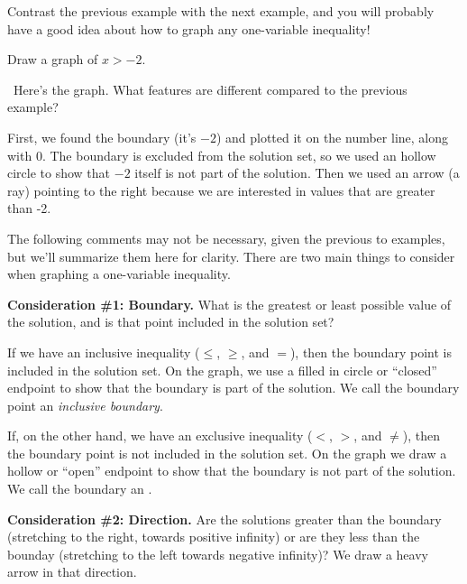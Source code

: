 Contrast the previous example with the next example, and you will probably have a good idea about how to graph any one-variable inequality!

\begin{boxedex}
Draw a graph of $x > -2$.

\exsoln\ Here's the graph. What features are different compared to the previous example?

\begin{center}
\end{center}

First, we found the boundary (it's $-2$) and plotted it on the number line, along with 0. The boundary is excluded from the solution set, so we used an hollow circle to show that $-2$ itself is not part of the solution. Then we used an arrow (a ray) pointing to the right because we are interested in values that are greater than -2.
\end{boxedex}

The following comments may not be necessary, given the previous to examples, but we'll summarize them here for clarity. There are two main things to consider when graphing a one-variable inequality.

\textbf{Consideration \#1: Boundary.} What is the greatest or least possible value of the solution, and is that point included in the solution set?

If we have an inclusive inequality ($\leq$, $\geq$, and $=$), then the boundary point is included in the solution set. On the graph, we use a filled in circle or ``closed'' endpoint to show that the boundary is part of the solution. We call the boundary point an \textit{inclusive boundary}.

If, on the other hand, we have an exclusive inequality ($<$, $>$, and $\neq$), then the boundary point is not included in the solution set. On the graph we draw a hollow or ``open'' endpoint to show that the boundary is not part of the solution. We call the boundary an .

\textbf{Consideration \#2: Direction.} Are the solutions greater than the boundary (stretching to the right, towards positive infinity) or are they less than the bounday (stretching to the left towards negative infinity)? We draw a heavy arrow in that direction.

